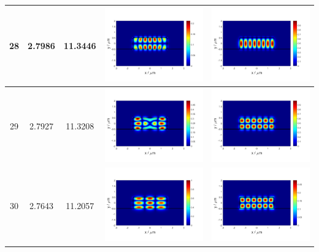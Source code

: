 \documentclass{assignment}
\begin{document}
\begin{sol}
\begin{itemize}
\begin{longtable}[c]{|c|c|c|c|c|}
            28 & 2.7986 & 11.3446 & \includegraphics[width=.3\columnwidth]{Assignment-2-mode-28-Ex.png} & \includegraphics[width=.3\columnwidth]{Assignment-2-mode-28-Ey.png} \\ \hline
            29 & 2.7927 & 11.3208 & \includegraphics[width=.3\columnwidth]{Assignment-2-mode-29-Ex.png} & \includegraphics[width=.3\columnwidth]{Assignment-2-mode-29-Ey.png} \\ \hline
            30 & 2.7643 & 11.2057 & \includegraphics[width=.3\columnwidth]{Assignment-2-mode-30-Ex.png} & \includegraphics[width=.3\columnwidth]{Assignment-2-mode-30-Ey.png} \\ \hline

\end{longtable}
\end{itemize}
\end{sol}
\end{document}
